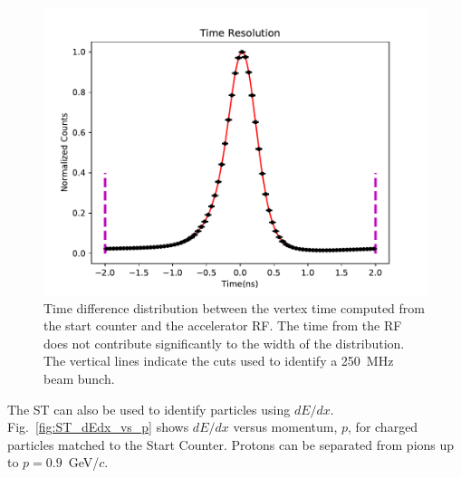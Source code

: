
\begin{figure}[tbh]
  \centering
  \includegraphics[width=0.6\linewidth]{figures/st_tr_fit.pdf}
  \caption{Time difference distribution between the vertex time computed from the start counter and the accelerator RF. The time from the RF does not contribute significantly to the width of the distribution. The vertical lines indicate the cuts used to identify a 250~MHz beam bunch.}
                \label{fig:st-time-resolution}
\end{figure}  


The ST can also be used to identify particles using $dE/dx$. Fig.~\ref{fig:ST_dEdx_vs_p} shows $dE/dx$ versus momentum, $p$,
for charged particles matched to the Start Counter. Protons can be
separated from pions up to $p=0.9$~GeV/$c$.

